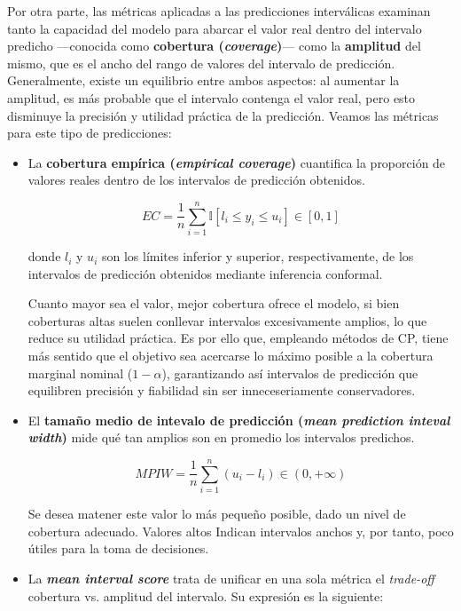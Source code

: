 Por otra parte, las métricas aplicadas a las predicciones interválicas examinan tanto la capacidad del modelo para abarcar el valor real dentro del intervalo predicho ---conocida como \textbf{cobertura (\textit{coverage})}--- como la \textbf{amplitud} del mismo, que es el ancho del rango de valores del intervalo de predicción. Generalmente, existe un equilibrio entre ambos aspectos: al aumentar la amplitud, es más probable que el intervalo contenga el valor real, pero esto disminuye la precisión y utilidad práctica de la predicción. Veamos las métricas para este tipo de predicciones: 

\begin{itemize}
    \item La \textbf{cobertura empírica (\textit{empirical coverage})} cuantifica la proporción de valores reales dentro de los intervalos de predicción obtenidos. 
    
    $$
    EC = \frac{1}{n} 
        \sum_{i=1}^n{ \mathbb{I} \left[ l_i \le y_i \le u_i \right] } 
            \in \left[0, 1\right]
    $$

    donde $l_i$ y $u_i$ son los límites inferior y superior, respectivamente, de los intervalos de predicción obtenidos mediante inferencia conformal.

    Cuanto mayor sea el valor, mejor cobertura ofrece el modelo, si bien coberturas altas suelen conllevar intervalos excesivamente amplios, lo que reduce su utilidad práctica. Es por ello que, empleando métodos de CP, tiene más sentido que el objetivo sea acercarse lo máximo posible a la cobertura marginal nominal ($1-\alpha$), garantizando así intervalos de predicción que equilibren precisión y fiabilidad sin ser inneceseriamente conservadores. 
    
    \item El \textbf{tamaño medio de intevalo de predicción (\textit{mean prediction inteval width})} mide qué tan amplios son en promedio los intervalos predichos.
    
    $$
    MPIW = \frac{1}{n} \sum_{i=1}^n{ \left( u_i - l_i \right) } \in (0, +\infty)
    $$
    
    Se desea matener este valor lo más pequeño posible, dado un nivel de cobertura adecuado. Valores altos Indican intervalos anchos y, por tanto, poco útiles para la toma de decisiones. 

    \item La \textbf{\textit{mean interval score}} \cite{gneiting2007} trata de unificar en una sola métrica el \textit{trade-off} cobertura vs. amplitud del intervalo. Su expresión es la siguiente:


\end{itemize}
